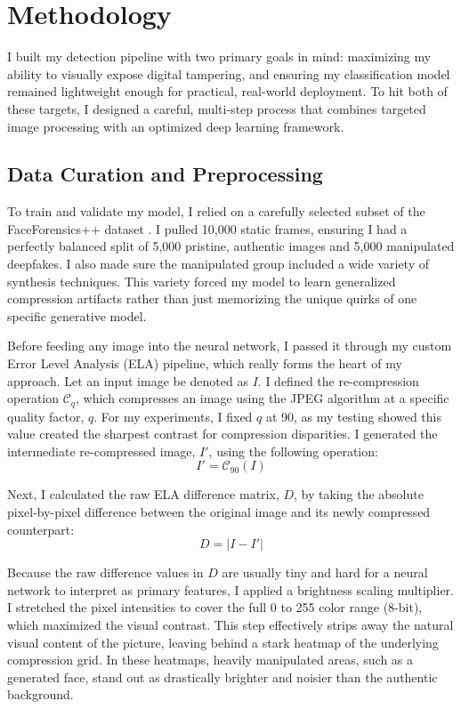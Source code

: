 \section{Methodology}
\label{sec:methodology}

I built my detection pipeline with two primary goals in mind: maximizing my ability to visually expose digital tampering, and ensuring my classification model remained lightweight enough for practical, real-world deployment. To hit both of these targets, I designed a careful, multi-step process that combines targeted image processing with an optimized deep learning framework.

\subsection{Data Curation and Preprocessing}

To train and validate my model, I relied on a carefully selected subset of the FaceForensics++ dataset \cite{faceforensics}. I pulled 10,000 static frames, ensuring I had a perfectly balanced split of 5,000 pristine, authentic images and 5,000 manipulated deepfakes. I also made sure the manipulated group included a wide variety of synthesis techniques. This variety forced my model to learn generalized compression artifacts rather than just memorizing the unique quirks of one specific generative model.

Before feeding any image into the neural network, I passed it through my custom Error Level Analysis (ELA) pipeline, which really forms the heart of my approach. Let an input image be denoted as $I$. I defined the re-compression operation $\mathcal{C}_{q}$, which compresses an image using the JPEG algorithm at a specific quality factor, $q$. For my experiments, I fixed $q$ at 90, as my testing showed this value created the sharpest contrast for compression disparities. I generated the intermediate re-compressed image, $I'$, using the following operation:
\begin{equation}
    I' = \mathcal{C}_{90}(I)
\end{equation}

Next, I calculated the raw ELA difference matrix, $D$, by taking the absolute pixel-by-pixel difference between the original image and its newly compressed counterpart:
\begin{equation}
    D = |I - I'|
\end{equation}

Because the raw difference values in $D$ are usually tiny and hard for a neural network to interpret as primary features, I applied a brightness scaling multiplier. I stretched the pixel intensities to cover the full 0 to 255 color range (8-bit), which maximized the visual contrast. This step effectively strips away the natural visual content of the picture, leaving behind a stark heatmap of the underlying compression grid. In these heatmaps, heavily manipulated areas, such as a generated face, stand out as drastically brighter and noisier than the authentic background.

